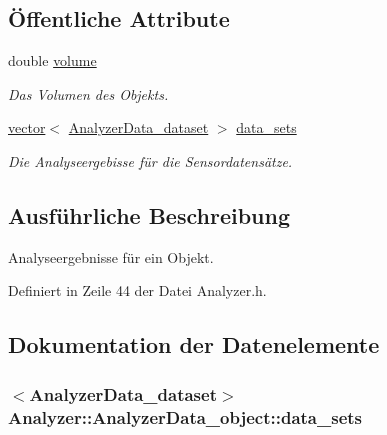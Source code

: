 \subsection*{Öffentliche Attribute}
\begin{DoxyCompactItemize}
\item 
double \hyperlink{structAnalyzer_1_1AnalyzerData__object_a78ddeb311ff702e110fc1d483d826920}{volume}
\begin{DoxyCompactList}\small\item\em Das Volumen des Objekts. \end{DoxyCompactList}\item 
\hyperlink{classstd_1_1vector}{vector}$<$ \hyperlink{structAnalyzer_1_1AnalyzerData__dataset}{Analyzer\-Data\-\_\-dataset} $>$ \hyperlink{structAnalyzer_1_1AnalyzerData__object_a5d36dcf805f37b0e29134236e3881fca}{data\-\_\-sets}
\begin{DoxyCompactList}\small\item\em Die Analyseergebisse für die Sensordatensätze. \end{DoxyCompactList}\end{DoxyCompactItemize}


\subsection{Ausführliche Beschreibung}
Analyseergebnisse für ein Objekt. 

Definiert in Zeile 44 der Datei Analyzer.\-h.



\subsection{Dokumentation der Datenelemente}
\hypertarget{structAnalyzer_1_1AnalyzerData__object_a5d36dcf805f37b0e29134236e3881fca}{
\subsubsection[{data\-\_\-sets}]{$<${\bf Analyzer\-Data\-\_\-dataset}$>$ Analyzer\-::\-Analyzer\-Data\-\_\-object\-::data\-\_\-sets}}\label{structAnalyzer_1_1AnalyzerData__object_a5d36dcf805f37b0e29134236e3881fca}


